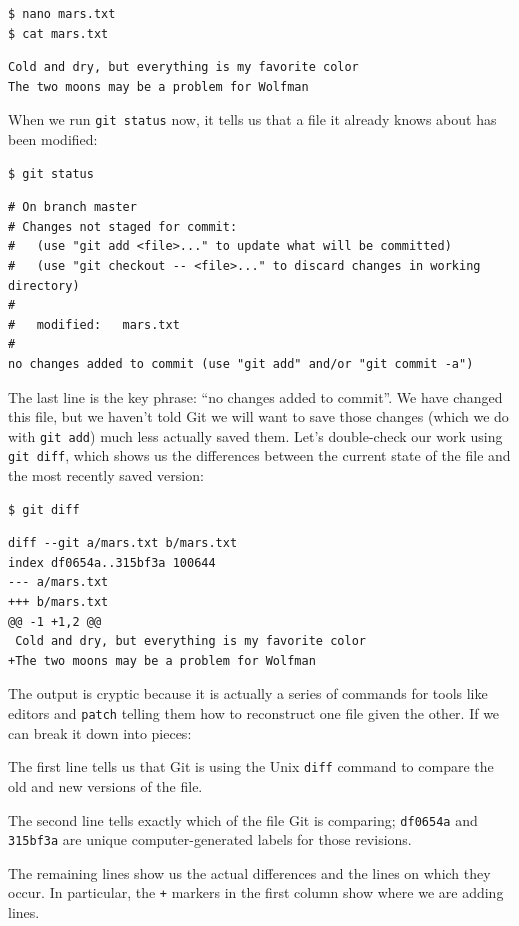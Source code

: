 \documentclass{book}
\begin{document}
\begin{verbatim}
$ nano mars.txt
$ cat mars.txt
\end{verbatim}

\begin{verbatim}
Cold and dry, but everything is my favorite color
The two moons may be a problem for Wolfman
\end{verbatim}

When we run \texttt{git status} now, it tells us that a file it already
knows about has been modified:

\begin{verbatim}
$ git status
\end{verbatim}

\begin{verbatim}
# On branch master
# Changes not staged for commit:
#   (use "git add <file>..." to update what will be committed)
#   (use "git checkout -- <file>..." to discard changes in working directory)
#
#   modified:   mars.txt
#
no changes added to commit (use "git add" and/or "git commit -a")
\end{verbatim}

The last line is the key phrase: ``no changes added to commit''. We have
changed this file, but we haven't told Git we will want to save those
changes (which we do with \texttt{git add}) much less actually saved
them. Let's double-check our work using \texttt{git diff}, which shows
us the differences between the current state of the file and the most
recently saved version:

\begin{verbatim}
$ git diff
\end{verbatim}

\begin{verbatim}
diff --git a/mars.txt b/mars.txt
index df0654a..315bf3a 100644
--- a/mars.txt
+++ b/mars.txt
@@ -1 +1,2 @@
 Cold and dry, but everything is my favorite color
+The two moons may be a problem for Wolfman
\end{verbatim}

The output is cryptic because it is actually a series of commands for
tools like editors and \texttt{patch} telling them how to reconstruct
one file given the other. If we can break it down into pieces:

\begin{swcenumerate}
\item
  The first line tells us that Git is using the Unix \texttt{diff}
  command to compare the old and new versions of the file.
\item
  The second line tells exactly which 
  of the file Git is comparing; \texttt{df0654a} and \texttt{315bf3a}
  are unique computer-generated labels for those revisions.
\item
  The remaining lines show us the actual differences and the lines on
  which they occur. In particular, the \texttt{+} markers in the first
  column show where we are adding lines.
\end{swcenumerate}
\end{document}
